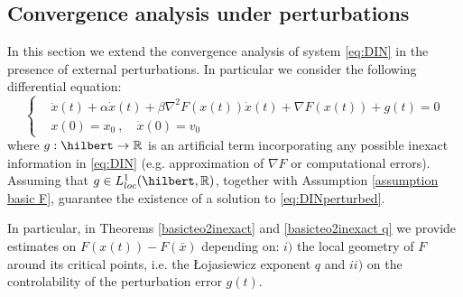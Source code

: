 \documentclass[reqno]{amsart}
\theoremstyle{plain}
\newtheorem{theorem}{Theorem}	%
\theoremstyle{definition}
\theoremstyle{remark}
\newcommand{\R}{\mathbb{R}}	%
\DeclareMathOperator{\crit}{crit}	%
\begin{document}






\subsection{Convergence analysis under perturbations}\label{paragraph stability}

In this section we extend the convergence analysis of system \eqref{eq:DIN} in the presence of external perturbations. In particular we consider the following differential equation:
\begin{equation}\label{eq:DINperturbed}\tag{DIN-p}
	\begin{cases}
		&\ddot{x}(t) +\alpha\dot{x}(t) +\beta\nabla^{2}F(x(t))\dot{x}(t) +\nabla F(x(t)) +g(t) =0 \\ 
		& x(0) = x_{0} ~, \quad \dot{x}(0) =v_{0}
	\end{cases}
\end{equation} 
where $g:\hilbert\to\R$ is an artificial term incorporating any possible inexact information in \eqref{eq:DIN} (e.g. approximation of $\nabla F$ or computational errors). Assuming that $g\in L^{1}_{loc}(\hilbert,\R)$, together with Assumption \ref{assumption basic F}, guarantee the existence of a solution to \eqref{eq:DINperturbed}. 

In particular, in Theorems \ref{basicteo2inexact} and \ref{basicteo2inexact q} we provide estimates on $F(x(t))-F(\bar{x})$ depending on: $i)$ the local geometry of $F$ around its critical points, i.e. the \L ojasiewicz exponent $q$ and $ii)$ on the controlability of the perturbation error $g(t)$.
\end{document}
